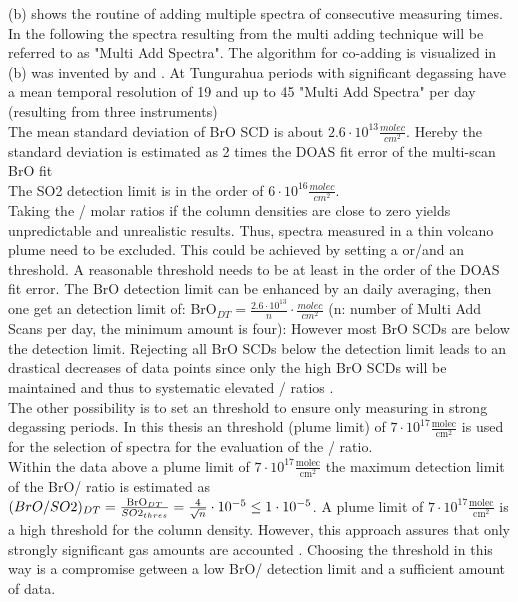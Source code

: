 (b) shows the routine of adding multiple spectra of consecutive measuring times. In the following the spectra resulting from the multi adding technique will be referred to as "Multi Add Spectra". The algorithm for co-adding is visualized in  (b) was invented by \citet{vogel2011volcanic} and \citet{lubcke2014bro}. At Tungurahua periods with significant degassing have a mean temporal resolution of 19 and up to 45 "Multi Add Spectra" per day (resulting from three instruments)\\

The mean standard deviation of BrO SCD is about $2.6\cdot10^{13} \frac{molec}{cm^{2}}$. Hereby the standard deviation is estimated as 2 times the DOAS fit error of the multi-scan BrO fit \citet{Stutz96} \\
%
The SO2	detection limit is in the order of $6\cdot10^{16}\frac{molec}{cm^{2}}$.\\
%
Taking the / molar ratios if the column densities are close to zero yields unpredictable and unrealistic results. 
Thus, spectra measured in a thin volcano plume need to be excluded.
This could be achieved by setting a  or/and an  threshold. A reasonable  threshold needs to be at least in the order of the DOAS fit error. The BrO detection limit can be enhanced by an daily averaging, then one get an detection limit of: BrO$_{DT}=\frac{2.6\cdot10^{13}}{n}\cdot\frac{molec}{cm^{2}}$ (n: number of Multi Add Scans per day, the minimum amount is four): However most BrO SCDs are below the detection limit.
Rejecting all BrO SCDs below the detection limit leads to an drastical decreases of data points since only the high BrO SCDs will be maintained and thus to systematic elevated / ratios  \citep{lubcke2014bro}.\\
%
The other possibility is to set an  threshold to ensure only measuring in strong degassing periods. In this thesis an  threshold (plume limit) of $7\cdot 10^{17} \frac{\text{molec}}{\text{cm}^2}$ is used for the selection of spectra for the evaluation of the / ratio. \\
%
Within the data above a  plume limit of $7\cdot 10^{17} \frac{\text{molec}}{\text{cm}^2}$ the maximum detection limit of the BrO/ ratio is estimated as $(BrO/SO2)_{DT}	=	\frac{\ce{BrO}_{DT}}{SO2_{thres}}=\frac{4	}{\sqrt{n}}\cdot10^{-5}	 \leq 	1\cdot10^{-5}$.
A plume limit of $7\cdot 10^{17} \frac{\text{molec}}{\text{cm}^2}$ is a high threshold for the column density. However, this approach assures that only strongly significant gas amounts are accounted \citep{lubcke2014bro}. Choosing the  threshold in this way is a compromise getween a low BrO/ detection limit and a sufficient amount of data.\\
